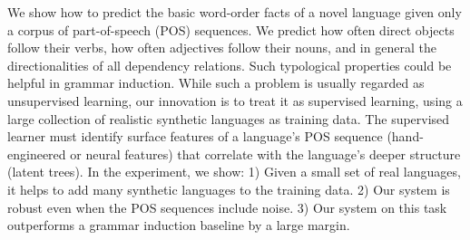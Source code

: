 We show how to predict the basic word-order facts of a novel language given only a corpus of part-of-speech (POS) sequences. We predict how often direct objects follow their verbs, how often adjectives follow their nouns, and in general the directionalities of all dependency relations. Such typological properties could be helpful in grammar induction. While such a problem is usually regarded as unsupervised learning, our innovation is to treat it as supervised learning, using a large collection of realistic synthetic languages as training data. The supervised learner must identify surface features of a language’s POS sequence (hand-engineered or neural features) that correlate with the language’s deeper structure (latent trees). In the experiment, we show{:} 1) Given a small set of real languages, it helps to add many synthetic languages to the training data. 2) Our system is robust even when the POS sequences include noise. 3) Our system on this task outperforms a grammar induction baseline by a large margin.
